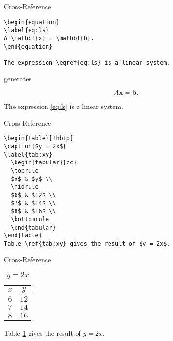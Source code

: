 \begin{frame}[fragile]{Cross-Reference}
\protect\hypertarget{cross-reference}{}
\begin{verbatim}
\begin{equation}
\label{eq:ls}
A \mathbf{x} = \mathbf{b}.
\end{equation}

The expression \eqref{eq:ls} is a linear system.
\end{verbatim}

generates

\begin{equation}
\label{eq:ls}
A \mathbf{x} = \mathbf{b}.
\end{equation}

The expression \eqref{eq:ls} is a linear system.
\end{frame}

\begin{frame}[fragile]{Cross-Reference}
\protect\hypertarget{cross-reference-1}{}
\begin{verbatim}
\begin{table}[!hbtp]
\caption{$y = 2x$}
\label{tab:xy}
  \begin{tabular}{cc}
  \toprule
  $x$ & $y$ \\
  \midrule
  $6$ & $12$ \\
  $7$ & $14$ \\
  $8$ & $16$ \\
  \bottomrule
  \end{tabular}
\end{table}
Table \ref{tab:xy} gives the result of $y = 2x$.
\end{verbatim}
\end{frame}

\begin{frame}{Cross-Reference}
\protect\hypertarget{cross-reference-2}{}
\begin{table}[!hbtp]
\caption{$y = 2x$}
\label{tab:xy}
  \begin{tabular}{cc}
  \toprule
  $x$ & $y$ \\
  \midrule
  $6$ & $12$ \\
  $7$ & $14$ \\
  $8$ & $16$ \\
  \bottomrule
  \end{tabular}
\end{table}

Table \ref{tab:xy} gives the result of \(y = 2x\).
\end{frame}
